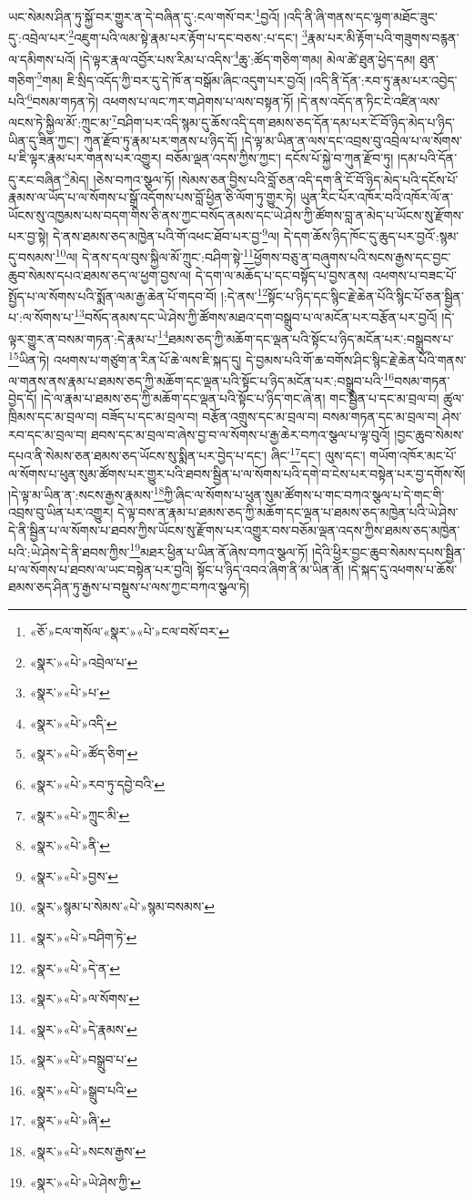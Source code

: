 ཡང་སེམས་ཤིན་ཏུ་སྐྱོ་བར་གྱུར་ན་དེ་བཞིན་དུ་:ངལ་གསོ་བར་\footnote{«ཅོ་»ངལ་གསོལ་«སྣར་»«པེ་»ངལ་བསོ་བར་}བྱའོ། །འདི་ནི་ཞི་གནས་དང་ལྷག་མཐོང་ཟུང་དུ་:འབྲེལ་པར་\footnote{«སྣར་»«པེ་»འབྲེལ་པ་}འཇུག་པའི་ལམ་སྟེ་རྣམ་པར་རྟོག་པ་དང་བཅས་:པ་དང་། \footnote{«སྣར་»«པེ་»པ་}རྣམ་པར་མི་རྟོག་པའི་གཟུགས་བརྙན་ལ་དམིགས་པའོ། །དེ་ལྟར་རྣལ་འབྱོར་པས་རིམ་པ་འདིས་\footnote{«སྣར་»«པེ་»འདི་}ཆུ་:ཚོད་གཅིག་གམ། མེལ་ཚེ་ཐུན་ཕྱེད་དམ། ཐུན་གཅིག་\footnote{«སྣར་»«པེ་»ཚོད་ཅིག་}གམ། ཇི་སྲིད་འདོད་ཀྱི་བར་དུ་དེ་ཁོ་ན་བསྒོམ་ཞིང་འདུག་པར་བྱའོ། །འདི་ནི་དོན་:རབ་ཏུ་རྣམ་པར་འབྱེད་པའི་\footnote{«སྣར་»«པེ་»རབ་ཏུ་དབྱེ་བའི་}བསམ་གཏན་ཏེ། འཕགས་པ་ལང་ཀར་གཤེགས་པ་ལས་བསྟན་ཏོ། །དེ་ནས་འདོད་ན་ཏིང་ངེ་འཛིན་ལས་ལངས་ཏེ་སྐྱིལ་མོ་:ཀྲུང་མ་\footnote{«སྣར་»«པེ་»ཀྲུང་མི་}བཤིག་པར་འདི་སྙམ་དུ་ཆོས་འདི་དག་ཐམས་ཅད་དོན་དམ་པར་ངོ་བོ་ཉིད་མེད་པ་ཉིད་ཡིན་དུ་ཟིན་ཀྱང་། ཀུན་རྫོབ་ཏུ་རྣམ་པར་གནས་པ་ཉིད་དོ། །དེ་ལྟ་མ་ཡིན་ན་ལས་དང་འབྲས་བུ་འབྲེལ་པ་ལ་སོགས་པ་ཇི་ལྟར་རྣམ་པར་གནས་པར་འགྱུར། བཅོམ་ལྡན་འདས་ཀྱིས་ཀྱང་། དངོས་པོ་སྐྱེ་བ་ཀུན་རྫོབ་ཏུ། །དམ་པའི་དོན་དུ་རང་བཞིན་\footnote{«སྣར་»«པེ་»ནི་}མེད། །ཅེས་བཀའ་སྩལ་ཏོ། །སེམས་ཅན་བྱིས་པའི་བློ་ཅན་འདི་དག་ནི་ངོ་བོ་ཉིད་མེད་པའི་དངོས་པོ་རྣམས་ལ་ཡོད་པ་ལ་སོགས་པ་སྒྲོ་འདོགས་པས་བློ་ཕྱིན་ཅི་ལོག་ཏུ་གྱུར་ཏེ། ཡུན་རིང་པོར་འཁོར་བའི་འཁོར་ལོ་ན་ཡོངས་སུ་འཁྱམས་པས་བདག་གིས་ཅི་ནས་ཀྱང་བསོད་ནམས་དང་ཡེ་ཤེས་ཀྱི་ཚོགས་བླ་ན་མེད་པ་ཡོངས་སུ་རྫོགས་པར་བྱ་སྟེ། དེ་ནས་ཐམས་ཅད་མཁྱེན་པའི་གོ་འཕང་ཐོབ་པར་བྱ་\footnote{«སྣར་»«པེ་»བྱས་}ལ། དེ་དག་ཆོས་ཉིད་ཁོང་དུ་ཆུད་པར་བྱའོ་:སྙམ་དུ་བསམས་\footnote{«སྣར་»སྙམ་པ་སེམས་«པེ་»སྙམ་བསམས་}ལ། དེ་ནས་དལ་བུས་སྐྱིལ་མོ་ཀྲུང་:བཤིག་སྟེ་\footnote{«སྣར་»«པེ་»བཤིག་ཏེ་}ཕྱོགས་བཅུ་ན་བཞུགས་པའི་སངས་རྒྱས་དང་བྱང་ཆུབ་སེམས་དཔའ་ཐམས་ཅད་ལ་ཕྱག་བྱས་ལ། དེ་དག་ལ་མཆོད་པ་དང་བསྟོད་པ་བྱས་ནས། འཕགས་པ་བཟང་པོ་སྤྱོད་པ་ལ་སོགས་པའི་སྨོན་ལམ་རྒྱ་ཆེན་པོ་གདབ་བོ། །:དེ་ནས་\footnote{«སྣར་»«པེ་»དེ་ན་}སྟོང་པ་ཉིད་དང་སྙིང་རྗེ་ཆེན་པོའི་སྙིང་པོ་ཅན་སྦྱིན་པ་:ལ་སོགས་པ་\footnote{«སྣར་»«པེ་»ལ་སོགས་}བསོད་ནམས་དང་ཡེ་ཤེས་ཀྱི་ཚོགས་མཐའ་དག་བསྒྲུབ་པ་ལ་མངོན་པར་བརྩོན་པར་བྱའོ། །དེ་ལྟར་གྱུར་ན་བསམ་གཏན་:དེ་རྣམ་པ་\footnote{«སྣར་»«པེ་»དེ་རྣམས་}ཐམས་ཅད་ཀྱི་མཆོག་དང་ལྡན་པའི་སྟོང་པ་ཉིད་མངོན་པར་:བསྒྲུབས་པ་\footnote{«སྣར་»«པེ་»བསྒྲུབ་པ་}ཡིན་ཏེ། འཕགས་པ་གཙུག་ན་རིན་པོ་ཆེ་ལས་ཇི་སྐད་དུ། དེ་བྱམས་པའི་གོ་ཆ་བགོས་ཤིང་སྙིང་རྗེ་ཆེན་པོའི་གནས་ལ་གནས་ནས་རྣམ་པ་ཐམས་ཅད་ཀྱི་མཆོག་དང་ལྡན་པའི་སྟོང་པ་ཉིད་མངོན་པར་:བསྒྲུབ་པའི་\footnote{«སྣར་»«པེ་»སྒྲུབ་པའི་}བསམ་གཏན་བྱེད་དོ། །དེ་ལ་རྣམ་པ་ཐམས་ཅད་ཀྱི་མཆོག་དང་ལྡན་པའི་སྟོང་པ་ཉིད་གང་ཞེ་ན། གང་སྦྱིན་པ་དང་མ་བྲལ་བ། ཚུལ་ཁྲིམས་དང་མ་བྲལ་བ། བཟོད་པ་དང་མ་བྲལ་བ། བརྩོན་འགྲུས་དང་མ་བྲལ་བ། བསམ་གཏན་དང་མ་བྲལ་བ། ཤེས་རབ་དང་མ་བྲལ་བ། ཐབས་དང་མ་བྲལ་བ་ཞེས་བྱ་བ་ལ་སོགས་པ་རྒྱ་ཆེར་བཀའ་སྩལ་པ་ལྟ་བུའོ། །བྱང་ཆུབ་སེམས་དཔའ་ནི་སེམས་ཅན་ཐམས་ཅད་ཡོངས་སུ་སྨིན་པར་བྱེད་པ་དང་། ཞིང་\footnote{«སྣར་»«པེ་»ཞི་}དང་། ལུས་དང་། གཡོག་འཁོར་མང་པོ་ལ་སོགས་པ་ཕུན་སུམ་ཚོགས་པར་གྱུར་པའི་ཐབས་སྦྱིན་པ་ལ་སོགས་པའི་དགེ་བ་ངེས་པར་བསྟེན་པར་བྱ་དགོས་སོ། །དེ་ལྟ་མ་ཡིན་ན་:སངས་རྒྱས་རྣམས་\footnote{«སྣར་»«པེ་»སངས་རྒྱས་}ཀྱི་ཞིང་ལ་སོགས་པ་ཕུན་སུམ་ཚོགས་པ་གང་བཀའ་སྩལ་པ་དེ་གང་གི་འབྲས་བུ་ཡིན་པར་འགྱུར། དེ་ལྟ་བས་ན་རྣམ་པ་ཐམས་ཅད་ཀྱི་མཆོག་དང་ལྡན་པ་ཐམས་ཅད་མཁྱེན་པའི་ཡེ་ཤེས་དེ་ནི་སྦྱིན་པ་ལ་སོགས་པ་ཐབས་ཀྱིས་ཡོངས་སུ་རྫོགས་པར་འགྱུར་བས་བཅོམ་ལྡན་འདས་ཀྱིས་ཐམས་ཅད་མཁྱེན་པའི་:ཡེ་ཤེས་དེ་ནི་ཐབས་ཀྱིས་\footnote{«སྣར་»«པེ་»ཡེ་ཤེས་ཀྱི་}མཐར་ཕྱིན་པ་ཡིན་ནོ་ཞེས་བཀའ་སྩལ་ཏོ། །དེའི་ཕྱིར་བྱང་ཆུབ་སེམས་དཔས་སྦྱིན་པ་ལ་སོགས་པ་ཐབས་ལ་ཡང་བསྟེན་པར་བྱའི། སྟོང་པ་ཉིད་འབའ་ཞིག་ནི་མ་ཡིན་ནོ། །དེ་སྐད་དུ་འཕགས་པ་ཆོས་ཐམས་ཅད་ཤིན་ཏུ་རྒྱས་པ་བསྡུས་པ་ལས་ཀྱང་བཀའ་སྩལ་ཏེ། 